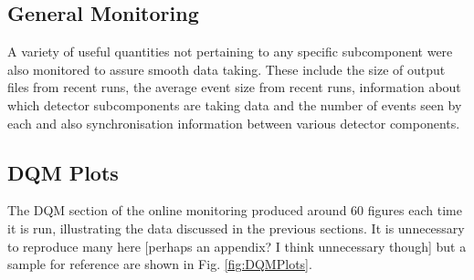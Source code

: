 \subsection{General Monitoring}\label{sec:GeneralMonitoring}

A variety of useful quantities not pertaining to any specific subcomponent were also monitored to assure smooth data taking.  These include the size of output files from recent runs, the average event size from recent runs, information about which detector subcomponents are taking data and the number of events seen by each and also synchronisation information between various detector components.

\subsection{DQM Plots}\label{sec:DQMPlots}

The DQM section of the online monitoring produced around 60 figures each time it is run, illustrating the data discussed in the previous sections.  It is unnecessary to reproduce many here [perhaps an appendix? I think unnecessary though] but a sample for reference are shown in Fig. \ref{fig:DQMPlots}.

